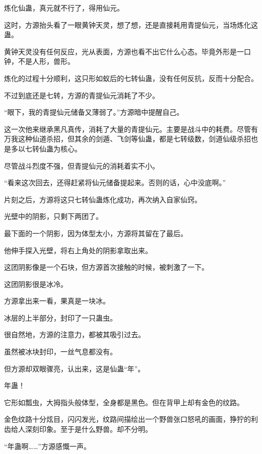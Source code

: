 
\begin{this_body}



炼化仙蛊，真元就不行了，得用仙元。

这时，方源抬头看了一眼黄钟天灵，想了想，还是直接耗用青提仙元，当场炼化这蛊。

黄钟天灵没有任何反应，光从表面，方源也看不出它什么心态。毕竟外形是一口钟，不是人形，兽形。

炼化的过程十分顺利，这只形如蚁后的七转仙蛊，没有任何反抗，反而十分配合。

不过到底还是七转，方源的青提仙元消耗了不少。

“眼下，我的青提仙元储备又薄弱了。”方源暗中提醒自己。

这一次他来继承黑凡真传，消耗了大量的青提仙元。主要是战斗中的耗费。尽管有万我这种仙道杀招，但其余的剑遁、飞剑等仙蛊，都是七转级数，剑道仙级杀招也是多以七转仙蛊为核心。

尽管战斗烈度不强，但青提仙元的消耗着实不小。

“看来这次回去，还得赶紧将仙元储备提起来。否则的话，心中没底啊。”

片刻之后，方源将这只七转仙蛊炼化成功，再次纳入自家仙窍。

光壁中的阴影，只剩下两团了。

最下面的一个阴影，因为体型太小，方源将其留在了最后。

他伸手探入光壁，将右上角处的阴影拿取出来。

这团阴影像是一个石块，但方源首次接触的时候，被刺激了一下。

这团阴影很是冰冷。

方源拿出来一看，果真是一块冰。

冰层的上半部分，封印了一只蛊虫。

很自然地，方源的注意力，都被其吸引过去。

虽然被冰块封印，一丝气息都没有。

但方源却双眼骤亮，认出来，这是仙蛊“年”。

年蛊！

它形如瓢虫，大拇指头般体型，全身都是黑色。但在背甲上却有金色的纹路。

金色纹路十分炫目，闪闪发光，纹路间描绘出一个野兽张口怒吼的画面，狰狞的利齿给人深刻印象。至于是什么野兽。却不分明。

“年蛊啊……”方源感慨一声。


\end{this_body}
